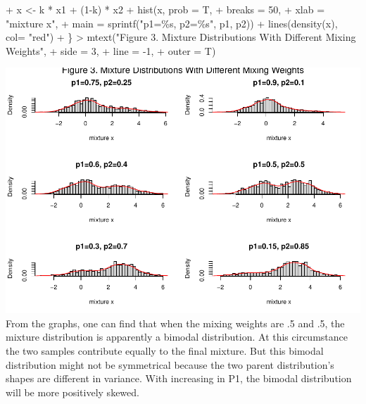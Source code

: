 \documentclass[
]{article}
\newenvironment{Shaded}{\begin{snugshade}}{\end{snugshade}}
\newcommand{\AttributeTok}[1]{\textcolor[rgb]{0.77,0.63,0.00}{#1}}
\newcommand{\DecValTok}[1]{\textcolor[rgb]{0.00,0.00,0.81}{#1}}
\newcommand{\FunctionTok}[1]{\textcolor[rgb]{0.00,0.00,0.00}{#1}}
\newcommand{\NormalTok}[1]{#1}
\newcommand{\OtherTok}[1]{\textcolor[rgb]{0.56,0.35,0.01}{#1}}
\newcommand{\SpecialCharTok}[1]{\textcolor[rgb]{0.00,0.00,0.00}{#1}}
\newcommand{\StringTok}[1]{\textcolor[rgb]{0.31,0.60,0.02}{#1}}
\begin{document}
\begin{Shaded}
\begin{Highlighting}[]
\SpecialCharTok{+}\NormalTok{   x }\OtherTok{\textless{}{-}}\NormalTok{ k }\SpecialCharTok{*}\NormalTok{ x1 }\SpecialCharTok{+}\NormalTok{ (}\DecValTok{1}\SpecialCharTok{{-}}\NormalTok{k) }\SpecialCharTok{*}\NormalTok{ x2}
\SpecialCharTok{+}   \FunctionTok{hist}\NormalTok{(x, }\AttributeTok{prob =}\NormalTok{ T, }
\SpecialCharTok{+}        \AttributeTok{breaks =} \DecValTok{50}\NormalTok{, }
\SpecialCharTok{+}        \AttributeTok{xlab =} \StringTok{"mixture x"}\NormalTok{,}
\SpecialCharTok{+}        \AttributeTok{main =} \FunctionTok{sprintf}\NormalTok{(}\StringTok{"p1=\%s, p2=\%s"}\NormalTok{, p1, p2))}
\SpecialCharTok{+}   \FunctionTok{lines}\NormalTok{(}\FunctionTok{density}\NormalTok{(x), }\AttributeTok{col=} \StringTok{"red"}\NormalTok{)}
\SpecialCharTok{+}\NormalTok{ \}}
\SpecialCharTok{\textgreater{}} \FunctionTok{mtext}\NormalTok{(}\StringTok{"Figure 3. Mixture Distributions With Different Mixing Weights"}\NormalTok{,}
\SpecialCharTok{+}       \AttributeTok{side =} \DecValTok{3}\NormalTok{,}
\SpecialCharTok{+}       \AttributeTok{line =} \SpecialCharTok{{-}}\DecValTok{1}\NormalTok{,}
\SpecialCharTok{+}       \AttributeTok{outer =}\NormalTok{ T)}
\end{Highlighting}
\end{Shaded}

\includegraphics{HW_02_Chenguang_Pan_files/figure-latex/unnamed-chunk-4-1.pdf}
From the graphs, one can find that when the mixing weights are .5 and
.5, the mixture distribution is apparently a bimodal distribution. At
this circumstance the two samples contribute equally to the final
mixture. But this bimodal distribution might not be symmetrical because
the two parent distribution's shapes are different in variance. With
increasing in P1, the bimodal distribution will be more positively
skewed.
\end{document}
